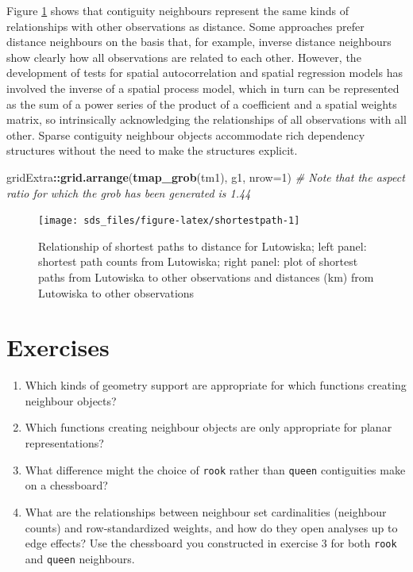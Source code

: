 \documentclass[]{book}
\newenvironment{Shaded}{\begin{snugshade}}{\end{snugshade}}
\newcommand{\CommentTok}[1]{\textcolor[rgb]{0.56,0.35,0.01}{\textit{#1}}}
\newcommand{\DataTypeTok}[1]{\textcolor[rgb]{0.13,0.29,0.53}{#1}}
\newcommand{\DecValTok}[1]{\textcolor[rgb]{0.00,0.00,0.81}{#1}}
\newcommand{\KeywordTok}[1]{\textcolor[rgb]{0.13,0.29,0.53}{\textbf{#1}}}
\newcommand{\NormalTok}[1]{#1}
\newcommand{\OperatorTok}[1]{\textcolor[rgb]{0.81,0.36,0.00}{\textbf{#1}}}
\providecommand{\tightlist}{%
  \setlength{\itemsep}{0pt}\setlength{\parskip}{0pt}}
\begin{document}
Figure \ref{fig:shortestpath} shows that contiguity neighbours represent the same kinds of relationships with other observations as distance. Some approaches prefer distance neighbours on the basis that, for example, inverse distance neighbours show clearly how all observations are related to each other. However, the development of tests for spatial autocorrelation and spatial regression models has involved the inverse of a spatial process model, which in turn can be represented as the sum of a power series of the product of a coefficient and a spatial weights matrix, so intrinsically acknowledging the relationships of all observations with all other. Sparse contiguity neighbour objects accommodate rich dependency structures without the need to make the structures explicit.



\begin{Shaded}
\begin{Highlighting}[]
\NormalTok{gridExtra}\OperatorTok{::}\KeywordTok{grid.arrange}\NormalTok{(}\KeywordTok{tmap_grob}\NormalTok{(tm1), g1, }\DataTypeTok{nrow=}\DecValTok{1}\NormalTok{)}
\CommentTok{# Note that the aspect ratio for which the grob has been generated is 1.44}
\end{Highlighting}
\end{Shaded}

\begin{figure}

{\centering \texttt{[image: sds\_files/figure-latex/shortestpath-1]} 

}

\caption{Relationship of shortest paths to distance for Lutowiska; left panel: shortest path counts from Lutowiska; right panel: plot of shortest paths from Lutowiska to other observations and distances (km) from Lutowiska to other observations}\label{fig:shortestpath}
\end{figure}

\hypertarget{exercises-12}{%
\section{Exercises}\label{exercises-12}}

\begin{enumerate}
\def\labelenumi{\arabic{enumi}.}
\tightlist
\item
  Which kinds of geometry support are appropriate for which functions creating neighbour objects?
\item
  Which functions creating neighbour objects are only appropriate for planar representations?
\item
  What difference might the choice of \texttt{rook} rather than \texttt{queen} contiguities make on a chessboard?
\item
  What are the relationships between neighbour set cardinalities (neighbour counts) and row-standardized weights, and how do they open analyses up to edge effects? Use the chessboard you constructed in exercise 3 for both \texttt{rook} and \texttt{queen} neighbours.
\end{enumerate}
\end{document}
